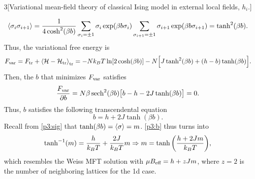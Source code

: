 \documentclass[12pt]{article}
\begin{document}
\begin{problem}{3}[Variational mean-field theory of classical Ising model in
    external local fields, $h_i$.]
\begin{solution}
\begin{align}
    \expval{\sigma_i\sigma_{i+1}}
    =\frac1{4\cosh^2(\beta b)}
    \sum_{\sigma_i=\pm 1}\sigma_i\exp(\beta b\sigma_i)
    \sum_{\sigma_{i+1}=\pm 1}\sigma_{i+1}\exp(\beta b\sigma_{i+1})
    =\tanh^2(\beta b).
\end{align}
Thus, the variational free energy is
\begin{equation}
    F_{\text{var}}
    =F_{\text{tr}}+\expval{\mathcal{H}-\mathcal{H}_{\text{tr}}}_{\text{tr}}
    =-Nk_BT\ln[2\cosh(\beta b)]
    -N\qty[J\tanh^2(\beta b)+(h-b)\tanh(\beta b)].
\end{equation}
Then, the $b$ that minimizes $F_{\text{var}}$ satisfies
\begin{equation}
    \frac{F_\t{var}}{\partial b}
    =N\beta\sech^2(\beta b)\qty[b-h-2 J\tanh(\beta b)]=0.
\end{equation}
Thus, $b$ satisfies the following transcendental equation
\begin{equation}\label{p3:b}
    b=h+2J\tanh(\beta b). 
\end{equation}
Recall from \eqref{p3:sig} that $\tanh(\beta b)=\expval\sigma=m$. \eqref{p3:b}
thus turns into
\begin{equation}
    \tanh^{-1}(m)=\frac{h}{k_BT}+\frac{2J}{k_BT}m
    \Rightarrow
    m=\tanh\qty(\frac{h+2Jm}{k_BT}),
\end{equation}
which resembles the Weiss MFT solution with $\mu B_{\text{eff}}=h+zJm$, where $z=2$ 
is the number of neighboring lattices for the 1d case.
\end{solution}
\end{problem}
\newpage
\end{document}
